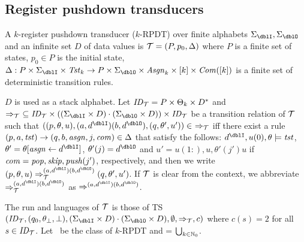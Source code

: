 \subsection{Register pushdown transducers}
\begin{definition}
A $k$-{register pushdown transducer} ($k$-RPDT) over finite alphabets $\Sigma_\dblI,\Sigma_\dblO$ and an infinite set $D$ of data values is
${\cal T}=(P, p_0, \Delta)$ where
$P$ is a finite set of states,
$p_0\in P$ is the initial state,
$\Delta: P\times\Sigma_\dblI\times\Tst_k \to P\times\Sigma_\dblO\times \Asgn_k \times [k]\times \Com([k])$ is a finite set of deterministic transition rules.
\end{definition}
$D$ is used as a stack alphabet.
Let $\mathit{ID}_{\cal T}= P\times \Theta_k\times D^*$
and $\Rightarrow_\calT\ \subseteq \ID_\calT\times ((\Sigma_\dblI\times D)\cdot(\Sigma_\dblO\times D))\times \ID_\calT$ be a transition relation of ${\cal T}$ such that $((p, \theta, u), (a,d^\dblI)(b,d^\dblO), (q, \theta', u'))\in\ \Rightarrow_\calT$ iff
there exist a rule $(p, a, \mathit{tst}) \to (q, b, \mathit{asgn}, j, \mathit{com}) \in \Delta$
that satisfy the follows:
$d^\dblI, u(0), \theta\models\tst$, $\theta' = \theta[\asgn\leftarrow d^\dblI]$, $\theta'(j) = d^\dblO$ and
$u'= u(1:),u,\theta'(j')u$ if $\mathit{com}=\mathit{pop},\mathit{skip},\mathit{push}(j')$, respectively,
and then we write $(p, \theta, u) \done_{\calT}^{(a,d^\dblI)(b,d^\dblO)}(q, \theta', u')$.
If ${\cal T}$ is clear from the context,
we abbreviate
$\done_{\calT}^{(a,d^\dblI)(b,d^\dblO)}$ as $\done^{(a,d^\dblI)(b,d^\dblO)}$.

The run and languages of ${\cal T}$ is those of TS $(\ID_\calT, (q_0,\theta_\bot, \bot), (\Sigma_\dblI\times D)\cdot(\Sigma_\dblO\times D), \emptyset, \Rightarrow_\calT, c)$ where $c(s)=2$ for all $s\in\mathit{ID}_{\cal T}$.
Let \RPDTk\ be the class of $k$-RPDT and \RPDT = $\bigcup_{k\in\mathbb{N}_0}$\RPDTk.

